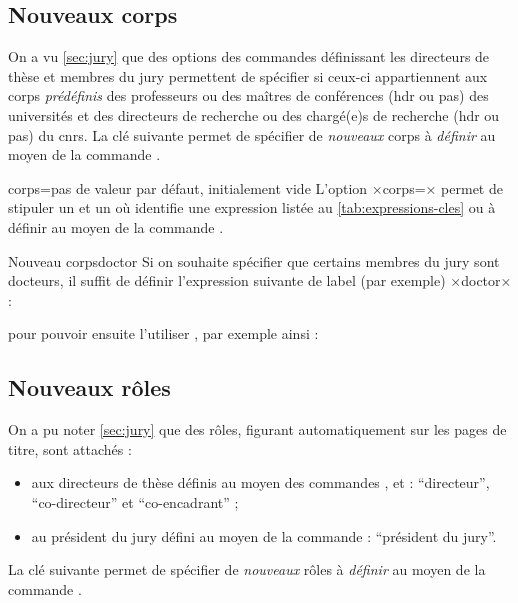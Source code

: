 \subsection{Nouveaux corps}\label{sec:nouveaux-corps}

On a vu \vref{sec:jury} que des options des commandes définissant les
directeurs de thèse et membres du jury permettent de spécifier si ceux-ci
appartiennent aux corps \emph{prédéfinis} des professeurs ou des maîtres de
conférences (\gls{hdr} ou pas) des universités et des directeurs de recherche
ou des chargé(e)s de recherche (\gls{hdr} ou pas) du \gls{cnrs}. La clé
 suivante permet de spécifier de \emph{nouveaux} corps
à \emph{définir} au moyen de la commande .

\begin{docKey}{corps}{=}{pas de
    valeur par défaut, initialement vide}
  L'option ×corps=× permet de stipuler un 
  et un  où  identifie une expression listée
  au \vref{tab:expressions-cles} ou à définir au moyen de la commande
  .
\end{docKey}

\begin{dbexample}{Nouveau corps}{doctor}
  Si on souhaite spécifier que certains membres du jury sont docteurs, il
  suffit de définir  l'expression suivante de label (par
  exemple) ×doctor× :
\begin{preamblecode}[title=Par exemple dans le \File{\configurationfile}]
\end{preamblecode}
  pour pouvoir ensuite l'utiliser , par
  exemple ainsi :
\begin{bodycode}
\end{bodycode}
\end{dbexample}

\subsection{Nouveaux rôles}\label{sec:nouveaux-roles}

On a pu noter \vref{sec:jury} que des rôles, figurant automatiquement sur les
pages de titre, sont attachés :
\begin{itemize}
\item aux directeurs de thèse définis au moyen des commandes
  ,  et  :
  \enquote{directeur}, \enquote{co-directeur} et \enquote{co-encadrant} ;
\item au président du jury défini au moyen de la commande
   : \enquote{président du jury}.
\end{itemize}
La clé  suivante permet de spécifier de \emph{nouveaux} rôles
à \emph{définir} au moyen de la commande .


